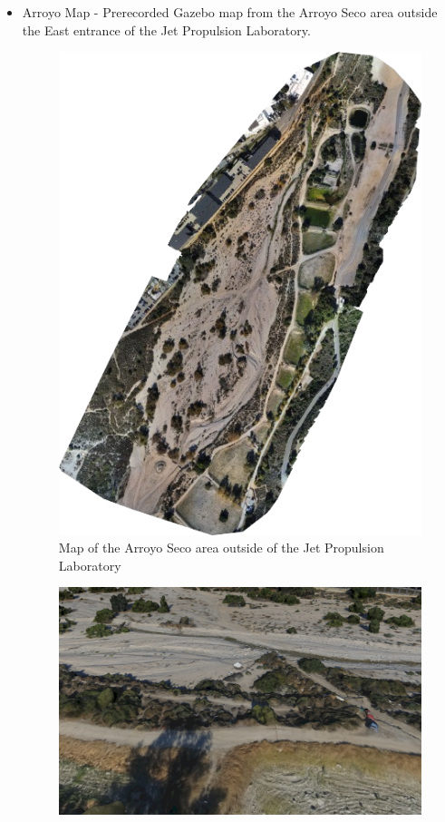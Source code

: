 \begin{itemize}
    \item Arroyo Map - Prerecorded Gazebo map from the Arroyo Seco area outside the East entrance of the Jet Propulsion Laboratory.
    \begin{figure}
        \centering
        \includegraphics[scale=0.5]{images/evaluation/arroyo.png}
        \caption{Map of the Arroyo Seco area outside of the Jet Propulsion Laboratory}
    \end{figure}
    \begin{figure}
        \centering
        \includegraphics[scale=0.23]{images/evaluation/arroyo_map.png}

\end{figure}
\end{itemize}
